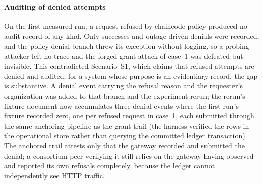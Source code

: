 \documentclass[preprint,12pt]{elsarticle}
\begin{document}
\paragraph{Auditing of denied attempts}
On the first measured run, a request refused by chaincode policy produced no
audit record of any kind. Only successes and outage-driven denials were
recorded, and the policy-denial branch threw its exception without logging, so
a probing attacker left no trace and the forged-grant attack of case~1 was
defeated but invisible. This contradicted Scenario~S1, which claims that
refused attempts are denied and audited; for a system whose purpose is an
evidentiary record, the gap is substantive. A denial event carrying the refusal reason and the requester's
organization was added to that branch and the experiment rerun; the rerun's
fixture document now accumulates three denial events where the first run's
fixture recorded zero, one per refused request in case~1, each submitted
through the same anchoring pipeline as the grant trail
(the harness verified the rows in the operational store rather than querying
the committed ledger transaction). The anchored trail attests only that
the gateway recorded and submitted the denial; a consortium peer verifying it
still relies on the gateway having observed and reported its own refusals
completely, because the ledger cannot independently see HTTP traffic.
\end{document}
